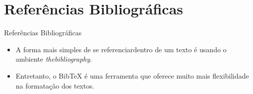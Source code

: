 \section{Referências Bibliográficas}

\begin{frame}{Referências Bibliográficas}
\begin{itemize}
 \item A forma mais simples de se referenciardentro de um texto é usando o ambiente \textit{thebibliography}.
\item Entretanto, o Bib\TeX{} é uma ferramenta que oferece muito mais flexibilidade na formatação dos textos.
\end{itemize}
\end{frame}

\begin{frame}

\end{frame}